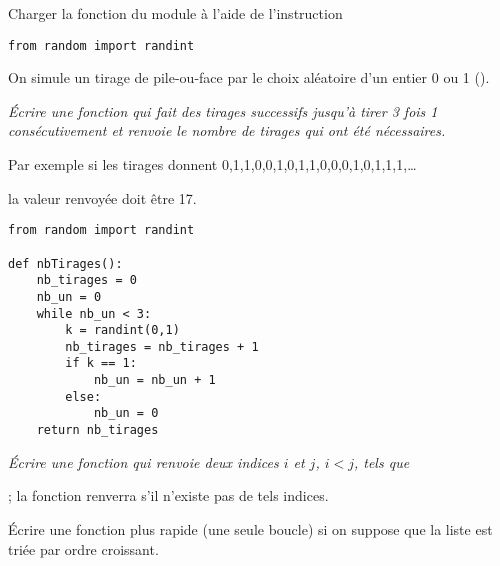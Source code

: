 Charger la fonction  du module  à l'aide de l'instruction 
\begin{lstlisting}
from random import randint
\end{lstlisting}

On simule un tirage de pile-ou-face par le choix aléatoire d'un entier 0 ou 1 ().
\begin{Exercise}[title= Hasard]\it
Écrire une fonction qui fait des tirages successifs jusqu'à tirer 3 fois 1 consécutivement et renvoie le nombre de tirages qui ont été nécessaires.

Par exemple si les tirages donnent 0,1,1,0,0,1,0,1,1,0,0,0,1,0,1,1,1,\dots 

la valeur renvoyée doit être 17. 
\end{Exercise}
\begin{Answer}
\begin{lstlisting}
from random import randint

def nbTirages():
    nb_tirages = 0 
    nb_un = 0 
    while nb_un < 3:
        k = randint(0,1)
        nb_tirages = nb_tirages + 1
        if k == 1:
            nb_un = nb_un + 1
        else:
            nb_un = 0
    return nb_tirages
\end{lstlisting}
\end{Answer}
\begin{Exercise}[title= Somme de deux termes]\it
Écrire une fonction  qui renvoie deux indices $i$ et $j$, $i < j$, tels que 

 ; la fonction renverra  s'il n'existe pas de tels indices. 

Écrire une fonction plus rapide (une seule boucle) si on suppose que la liste est triée par ordre croissant.
\end{Exercise}
